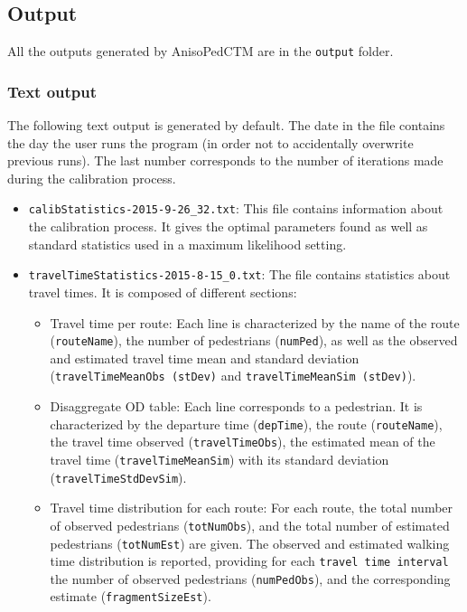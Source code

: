 \documentclass[a4paper,12pt]{article}
\begin{document}
\subsection{Output}

All the outputs generated by AnisoPedCTM are in the \verb+output+ folder.


\subsubsection{Text output}

The following text output is generated by default. The date in the file contains the day the user runs the program (in order not to accidentally overwrite previous runs). The last number corresponds to the number of iterations made during the calibration process.

\begin{itemize}
\item \verb+calibStatistics-2015-9-26_32.txt+: This file contains information about the calibration process. It gives the optimal parameters found as well as standard statistics used in a maximum likelihood setting.
\item \verb+travelTimeStatistics-2015-8-15_0.txt+:  The file contains statistics about travel times. It is composed of different sections: 
\begin{itemize}
\item Travel time per route: Each line is characterized by the name of the route (\verb+routeName+), the number of pedestrians (\verb+numPed+), as well as the observed and estimated travel time mean and standard deviation (\verb+travelTimeMeanObs (stDev)+ and \verb+travelTimeMeanSim (stDev)+).
\item Disaggregate OD table: Each line corresponds to a pedestrian. It is characterized by the departure time (\verb+depTime+), the route (\verb+routeName+), the travel time observed (\verb+travelTimeObs+), the estimated mean of the travel time (\verb+travelTimeMeanSim+) with its standard deviation (\verb+travelTimeStdDevSim+).
\item Travel time distribution for each route: For each route, the total number of observed pedestrians (\verb+totNumObs+), and the total number of estimated pedestrians  (\verb+totNumEst+) are given. The observed and estimated walking time distribution is reported, providing for each \verb+travel time interval+ the number of observed pedestrians (\verb+numPedObs+), and the corresponding estimate (\verb+fragmentSizeEst+). 
\end{itemize}
\end{itemize}
\end{document}
